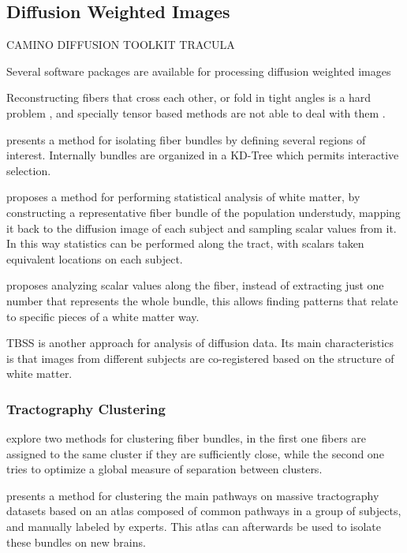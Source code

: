 \subsection{Diffusion Weighted Images}

CAMINO
DIFFUSION TOOLKIT
TRACULA



Several software packages are available for processing diffusion weighted images \autocite{hasan_review_2011}

Reconstructing fibers that cross each other, or fold in tight angles is a hard problem \autocite{fillard_quantitative_2011}, and specially tensor based methods are not able to deal with them \autocite{tournier_diffusion_2011}.


\autocite{blaas_fast_2005} presents a method for isolating fiber bundles by defining several regions of interest. Internally bundles are organized in a KD-Tree which permits interactive selection.

\autocite{goodlett_group_2008} proposes a method for performing statistical analysis of white matter, by constructing a representative fiber bundle of the population understudy, mapping it back to the diffusion image of each subject and sampling scalar values from it. In this way statistics can be performed along the tract, with scalars taken equivalent locations on each subject.

\autocite{colby_along-tract_2011} proposes analyzing scalar values along the fiber, instead of extracting just one number that represents the whole bundle, this allows finding patterns that relate to specific pieces of a white matter way.


TBSS \autocite{smith_tract-based_2006} is another approach for analysis of diffusion data. Its main characteristics is that images from different subjects are co-registered based on the structure of white matter. 

\subsubsection{Tractography Clustering}

\autocite{song_zhang_identifying_2008} explore two methods for clustering fiber bundles, in the first one fibers are assigned to the same cluster if they are sufficiently close, while the second one tries to optimize a global measure of separation between clusters.

\autocite{guevara_automatic_2012} presents a method for clustering the main pathways on massive tractography datasets based on an atlas composed of common pathways in a group of subjects, and manually labeled by experts. This atlas can afterwards be used to isolate these bundles on new brains.

